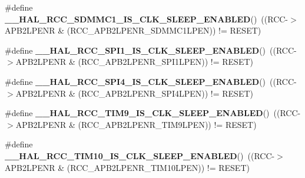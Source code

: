 \begin{DoxyCompactItemize}
\item 
\mbox{\label{group___r_c_c___clock___sleep___enable___disable___status_ga8669fae9cd9180844501db82f72f3b4f}} 
\#define {\bfseries \+\_\+\+\_\+\+H\+A\+L\+\_\+\+R\+C\+C\+\_\+\+S\+D\+M\+M\+C1\+\_\+\+I\+S\+\_\+\+C\+L\+K\+\_\+\+S\+L\+E\+E\+P\+\_\+\+E\+N\+A\+B\+L\+ED}()~((R\+CC-\/$>$A\+P\+B2\+L\+P\+E\+NR \& (R\+C\+C\+\_\+\+A\+P\+B2\+L\+P\+E\+N\+R\+\_\+\+S\+D\+M\+M\+C1\+L\+P\+EN)) != R\+E\+S\+ET)
\item 
\mbox{\label{group___r_c_c___clock___sleep___enable___disable___status_ga2db4e1edb831584a39e791c16edfea28}} 
\#define {\bfseries \+\_\+\+\_\+\+H\+A\+L\+\_\+\+R\+C\+C\+\_\+\+S\+P\+I1\+\_\+\+I\+S\+\_\+\+C\+L\+K\+\_\+\+S\+L\+E\+E\+P\+\_\+\+E\+N\+A\+B\+L\+ED}()~((R\+CC-\/$>$A\+P\+B2\+L\+P\+E\+NR \& (R\+C\+C\+\_\+\+A\+P\+B2\+L\+P\+E\+N\+R\+\_\+\+S\+P\+I1\+L\+P\+EN)) != R\+E\+S\+ET)
\item 
\mbox{\label{group___r_c_c___clock___sleep___enable___disable___status_ga56ffeb3ac3595705bd1e8be895242943}} 
\#define {\bfseries \+\_\+\+\_\+\+H\+A\+L\+\_\+\+R\+C\+C\+\_\+\+S\+P\+I4\+\_\+\+I\+S\+\_\+\+C\+L\+K\+\_\+\+S\+L\+E\+E\+P\+\_\+\+E\+N\+A\+B\+L\+ED}()~((R\+CC-\/$>$A\+P\+B2\+L\+P\+E\+NR \& (R\+C\+C\+\_\+\+A\+P\+B2\+L\+P\+E\+N\+R\+\_\+\+S\+P\+I4\+L\+P\+EN)) != R\+E\+S\+ET)
\item 
\mbox{\label{group___r_c_c___clock___sleep___enable___disable___status_ga255709a840c9a7e6f894df4f40ee6e64}} 
\#define {\bfseries \+\_\+\+\_\+\+H\+A\+L\+\_\+\+R\+C\+C\+\_\+\+T\+I\+M9\+\_\+\+I\+S\+\_\+\+C\+L\+K\+\_\+\+S\+L\+E\+E\+P\+\_\+\+E\+N\+A\+B\+L\+ED}()~((R\+CC-\/$>$A\+P\+B2\+L\+P\+E\+NR \& (R\+C\+C\+\_\+\+A\+P\+B2\+L\+P\+E\+N\+R\+\_\+\+T\+I\+M9\+L\+P\+EN)) != R\+E\+S\+ET)
\item 
\mbox{\label{group___r_c_c___clock___sleep___enable___disable___status_ga420cca0cf8e74d769361540b398154ea}} 
\#define {\bfseries \+\_\+\+\_\+\+H\+A\+L\+\_\+\+R\+C\+C\+\_\+\+T\+I\+M10\+\_\+\+I\+S\+\_\+\+C\+L\+K\+\_\+\+S\+L\+E\+E\+P\+\_\+\+E\+N\+A\+B\+L\+ED}()~((R\+CC-\/$>$A\+P\+B2\+L\+P\+E\+NR \& (R\+C\+C\+\_\+\+A\+P\+B2\+L\+P\+E\+N\+R\+\_\+\+T\+I\+M10\+L\+P\+EN)) != R\+E\+S\+ET)

\end{DoxyCompactItemize}
